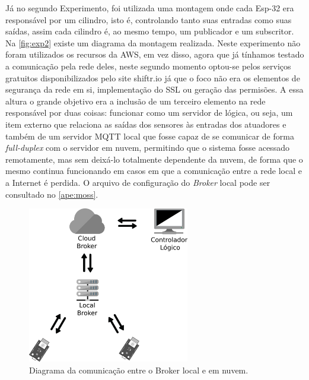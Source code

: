 Já no segundo Experimento, foi utilizada uma montagem onde cada Esp-32 era responsável por um cilindro, isto é, 
controlando tanto suas entradas como suas saídas, assim cada cilindro é, ao mesmo tempo, um publicador e um subscritor.
Na \autoref{fig:exp2} existe um diagrama da montagem realizada. Neste experimento não foram utilizados os recursos da AWS,
em vez disso, agora que já tínhamos testado a comunicação
pela rede deles, neste segundo momento optou-se pelos serviços gratuitos disponibilizados pelo site shiftr.io já que o foco 
não era os elementos de segurança da rede em si, implementação do \ac{SSL} ou geração das permisões. A essa altura o grande
objetivo era a inclusão de um terceiro elemento na rede responsável por duas coisas: funcionar como um servidor de lógica,
ou seja, um item externo que relaciona as saídas dos sensores às entradas dos atuadores e também de um servidor \ac{MQTT} local
que fosse capaz de se comunicar de forma \textit{full-duplex} com o servidor em nuvem, permitindo que o sistema fosse acessado 
remotamente, mas sem deixá-lo totalmente dependente da nuvem, de forma que o mesmo continua funcionando em casos em que 
a comunicação entre a rede local e a Internet é perdida. O arquivo de configuração do \textit{Broker} local pode ser consultado
no \autoref{ape:moss}.

\begin{figure}[htb]
    \begin{center}
	    \includegraphics[width=200pt]{figs/diag_conn.png}
	\end{center}
	\caption{\label{fig:exp2} Diagrama da comunicação entre o Broker local e em nuvem.} 
\end{figure}


